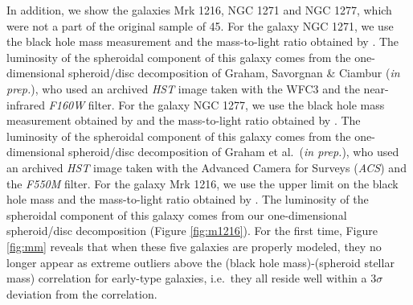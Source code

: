 \documentclass[useAMS,usenatbib,article]{mn2e}
\begin{document}
In addition, we show the galaxies Mrk 1216, NGC 1271 and NGC 1277, which were not a part of the original sample of 45.
For the galaxy NGC 1271, we use the black hole mass measurement and the mass-to-light ratio obtained by \cite{walsh2015}. 
The luminosity of the spheroidal component of this galaxy comes from the one-dimensional spheroid/disc decomposition 
of Graham, Savorgnan \& Ciambur (\emph{in prep.}),  
who used an archived \emph{HST} image taken with the WFC3 and the near-infrared \emph{F160W} filter. 
For the galaxy NGC 1277, we use the black hole mass measurement obtained by \cite{vandenbosch2012} 
and the mass-to-light ratio obtained by \cite{martinnavarro2015}. 
The luminosity of the spheroidal component of this galaxy comes from the one-dimensional spheroid/disc decomposition of Graham et al.~(\emph{in prep.}), 
who used an archived \emph{HST} image taken with the Advanced Camera for Surveys (\emph{ACS}) and the \emph{F550M} filter. 
For the galaxy Mrk 1216, we use the upper limit on the black hole mass and the mass-to-light ratio obtained by \cite{yildirim2015}. 
The luminosity of the spheroidal component of this galaxy comes from our one-dimensional spheroid/disc decomposition (Figure \ref{fig:m1216}).
For the first time, Figure \ref{fig:mm} reveals that when these five galaxies are properly modeled, 
they no longer appear as extreme outliers above the (black hole mass)-(spheroid stellar mass) correlation for early-type galaxies, 
i.e.~they all reside well within a $3\sigma$ deviation from the correlation.

\end{document}

